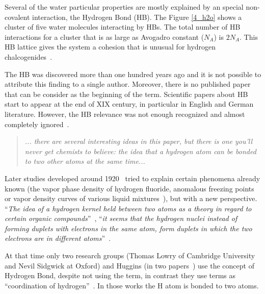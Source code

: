 Several of the water particular properties are mostly explained by an special
non-covalent interaction, the Hydrogen Bond (HB). The Figure \ref{4_h2o} shows
a cluster of five water molecules interacting by HBs. The total number of HB
interactions for a cluster that is as large as Avogadro constant ($N_A$) is
$2N_A$. This HB lattice gives the system a cohesion that is unusual for
hydrogen chalcogenides~\cite{smith2005}.

The HB was discovered more than one hundred years ago and it is not possible to
attribute this finding to a single author. Moreover, there is no published
paper that can be consider as the beginning of the term. Scientific papers
about HB start to appear at the end of XIX century, in particular in English
and German literature. However, the HB relevance was not enough recognized and
almost completely ignored~\cite{steiner,quane1990reception}.


\color{blue}
\begin{quote}
  \textit{... there are several interesting ideas in this paper, but there is one
  you'll never get chemists to believe: the idea that a hydrogen atom can be
  bonded to two other atoms at the same time...}
  \begin{flushright}
  \citet{hildebrand1958wendell}
  \end{flushright}
\end{quote}
\color{black}

Later studies developed around 1920~\citep{steiner} tried to explain certain
phenomena already known (the vapor phase density of hydrogen fluoride,
anomalous freezing points or vapor density curves of various liquid
mixtures~\cite{quane1990reception}), but with a new perspective.  ``\textit{The
idea of a hydrogen kernel held between two atoms as a theory in regard to
certain organic compounds}''~\citep{Latimer1920}, ``\textit{it seems that the
hydrogen nuclei instead of forming duplets with electrons in the same atom,
form duplets in which the two electrons are in different
atoms}''~\citep{Langmuir1921}.

\newpage

At that time only two research groups (Thomas Lowry of Cambridge University and
Nevil Sidgwick at Oxford) and Huggins (in two papers~\citep{Huggins1922,
Huggins1922_2}) use the concept of Hydrogen Bond, despite not using the term,
in contrast they use terms as ``coordination of hydrogen''~\cite{Sidgwick1924}.
In those works the H atom is bonded to two atoms.

